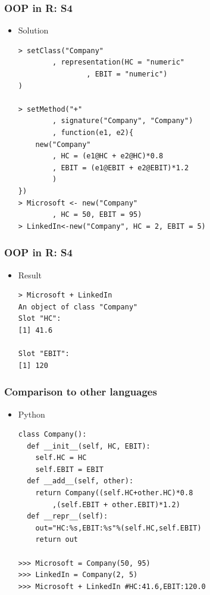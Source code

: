 \documentclass[bigger]{beamer}
\begin{document}
\begin{frame}[fragile]
\frametitle{OOP in R: S4}
\label{sec-5-4}
\begin{itemize}

\item Solution\\
\label{sec-5-4-1}%
\begin{verbatim}
> setClass("Company"
        , representation(HC = "numeric"
                , EBIT = "numeric")
)

> setMethod("+"
        , signature("Company", "Company")
        , function(e1, e2){
    new("Company"
        , HC = (e1@HC + e2@HC)*0.8
        , EBIT = (e1@EBIT + e2@EBIT)*1.2
        )
})
> Microsoft <- new("Company"
        , HC = 50, EBIT = 95)
> LinkedIn<-new("Company", HC = 2, EBIT = 5)
\end{verbatim}


\end{itemize} %
\end{frame}
\begin{frame}[fragile]
\frametitle{OOP in R: S4}
\label{sec-5-5}
\begin{itemize}

\item Result\\
\label{sec-5-5-1}%
\begin{verbatim}
> Microsoft + LinkedIn
An object of class "Company"
Slot "HC":
[1] 41.6

Slot "EBIT":
[1] 120
\end{verbatim}


\end{itemize} %
\end{frame}
\begin{frame}[fragile]
\frametitle{Comparison to other languages}
\label{sec-5-6}
\begin{itemize}

\item Python\\
\label{sec-5-6-1}%
\begin{verbatim}
class Company():
  def __init__(self, HC, EBIT):
    self.HC = HC
    self.EBIT = EBIT
  def __add__(self, other):
    return Company((self.HC+other.HC)*0.8 
        ,(self.EBIT + other.EBIT)*1.2)
  def __repr__(self):
    out="HC:%s,EBIT:%s"%(self.HC,self.EBIT)
    return out

>>> Microsoft = Company(50, 95)
>>> LinkedIn = Company(2, 5)
>>> Microsoft + LinkedIn #HC:41.6,EBIT:120.0
\end{verbatim}


\end{itemize} %
\end{frame}
\end{document}
